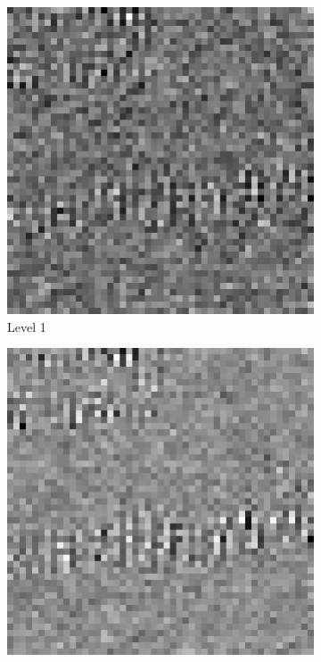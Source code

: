 \begin{figure}[t]
\begin{subfigure}{0.2\textwidth}
\end{subfigure}
\begin{subfigure}{0.2\textwidth}
\includegraphics[width=\textwidth]{img/aliasedImgDifL1}
\caption{Level 1}
\end{subfigure}%
\begin{subfigure}{0.2\textwidth}
\includegraphics[width=\textwidth]{img/aliasedImgDifL2}

\end{subfigure}
\end{figure}
